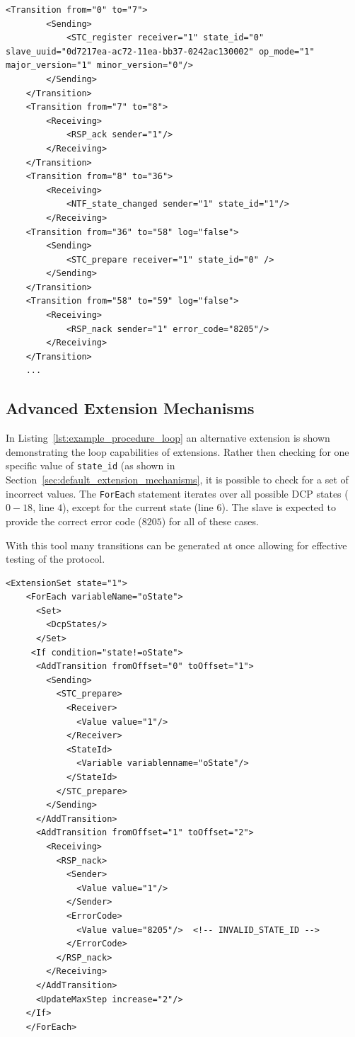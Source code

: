 \documentclass[a4paper]{scrartcl}
\theoremstyle{definition}
\begin{document}
\lstset{language=xml, numbers=left, numberstyle=\tiny, numbersep=10pt, frame=lines, captionpos=t, aboveskip=10pt, belowskip=10pt}
\begin{lstlisting}[caption=Snippet of the finished procedure, label=lst:example_procedure]
    <Transition from="0" to="7">
        <Sending>
            <STC_register receiver="1" state_id="0" slave_uuid="0d7217ea-ac72-11ea-bb37-0242ac130002" op_mode="1" major_version="1" minor_version="0"/>
        </Sending>
    </Transition>
    <Transition from="7" to="8">
        <Receiving>
            <RSP_ack sender="1"/>
        </Receiving>
    </Transition>
    <Transition from="8" to="36">
        <Receiving>
            <NTF_state_changed sender="1" state_id="1"/>
        </Receiving>
    <Transition from="36" to="58" log="false">
        <Sending>
            <STC_prepare receiver="1" state_id="0" />
        </Sending>
    </Transition>
    <Transition from="58" to="59" log="false">
        <Receiving>
            <RSP_nack sender="1" error_code="8205"/>
        </Receiving>
    </Transition>
    ...
\end{lstlisting}

\subsection{Advanced Extension Mechanisms}
\label{sec:advanced_extension_mechanisms}
In Listing~\ref{lst:example_procedure_loop} an alternative extension is shown demonstrating the loop capabilities of extensions.
Rather then checking for one specific value of \texttt{state\_id} (as shown in Section~\ref{sec:default_extension_mechanisms}, it is possible to check for a set of incorrect values.
The \texttt{ForEach} statement iterates over all possible DCP states ($0-18$, line $4$), except for the current state (line $6$).
The slave is expected to provide the correct error code ($8205$) for all of these cases.

With this tool many transitions can be generated at once allowing for effective testing of the protocol.

\lstset{language=xml, numbers=left, numberstyle=\tiny, numbersep=10pt, frame=lines, captionpos=t, aboveskip=10pt, belowskip=10pt}
\begin{lstlisting}[caption=Snipped of extension showing loops., label=lst:example_procedure_loop]
  <ExtensionSet state="1">
    <ForEach variableName="oState">
      <Set>
        <DcpStates/>
      </Set>
     <If condition="state!=oState">
      <AddTransition fromOffset="0" toOffset="1">
        <Sending>
          <STC_prepare>
            <Receiver>
              <Value value="1"/>
            </Receiver>
            <StateId>
              <Variable variablenname="oState"/>
            </StateId>
          </STC_prepare>
        </Sending>
      </AddTransition>
      <AddTransition fromOffset="1" toOffset="2">
        <Receiving>
          <RSP_nack>
            <Sender>
              <Value value="1"/>
            </Sender>
            <ErrorCode>
              <Value value="8205"/>  <!-- INVALID_STATE_ID -->
            </ErrorCode>
          </RSP_nack>
        </Receiving>
      </AddTransition>
      <UpdateMaxStep increase="2"/>
    </If>
    </ForEach>
\end{lstlisting}
\end{document}
